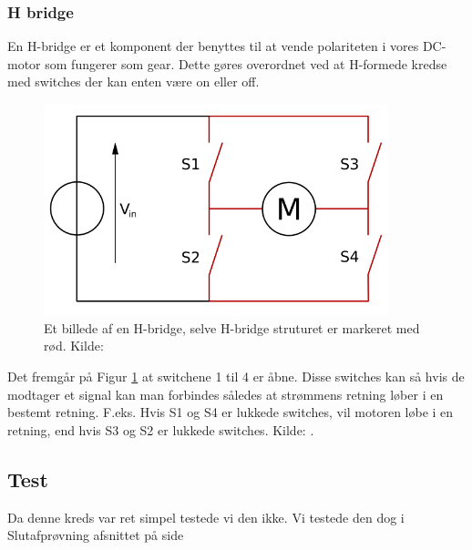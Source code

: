 \subsubsection{H bridge}\label{subs:hbridgeTeori}
En H-bridge er et komponent der benyttes til at vende polariteten i vores DC-motor som fungerer som gear. Dette gøres overordnet ved at H-formede kredse med switches der kan enten være on eller off. 
\begin{figure}[H]
	\centering
    \includegraphics[width=10cm]{figures/2_4_3hastighed/hbridge.png}
	\caption{Et billede af en H-bridge, selve H-bridge struturet er markeret med rød. Kilde: \cite{teorihbridge}}
	\label{fig:hbridge}
\end{figure}
Det fremgår på Figur \ref{fig:hbridge} at switchene 1 til 4 er åbne. Disse switches kan så hvis de modtager et signal kan man forbindes således at strømmens retning løber i en bestemt retning. F.eks. Hvis S1 og S4 er lukkede switches, vil motoren løbe i en retning, end hvis S3 og S2 er lukkede switches. Kilde: \cite{teorihbridge}. 


\subsection{Test}

Da denne kreds var ret simpel testede vi den ikke. Vi testede den dog i Slutafprøvning afsnittet på side \pageref{sluttest}